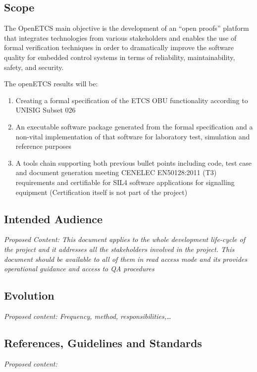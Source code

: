\documentclass{template/openetcs_article}
\begin{document}
\subsection{Scope}

The OpenETCS main objective is the development of an ``open proofs'' platform that integrates technologies from various stakeholders and enables the use of formal verification techniques in order to dramatically improve the software quality for embedded control systems in terms of reliability, maintainability, safety, and security.

The openETCS results will be:
\begin{enumerate}
\item Creating a formal specification of the ETCS OBU functionality according to UNISIG Subset 026

\item An executable software package generated from the formal specification and a non-vital implementation of that software for laboratory test, simulation and reference purposes

\item A tools chain supporting both previous bullet points including code, test case and document generation meeting CENELEC EN50128:2011 (T3) requirements and certifiable for SIL4 software applications for signalling equipment (Certification itself is not part of the project)
\end{enumerate}


\subsection{Intended Audience}
\textit{Proposed Content: This document applies to the whole development life-cycle of the project and it addresses all the stakeholders involved in the project. This document should be available to all of them in read access mode and it{\textquotesingle}s provides operational guidance and access to QA procedures}

\subsection{Evolution}
\textit{Proposed content: Frequency, method, responsibilities,{\dots}}

\subsection{References, Guidelines and Standards}
\textit{Proposed content:}
\end{document}
